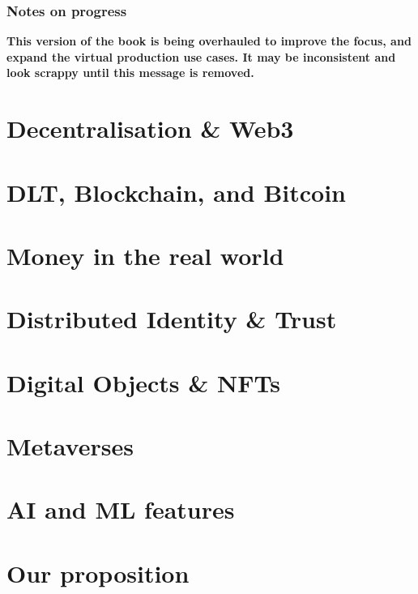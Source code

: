 \documentclass[
	12pt, %
	fleqn, %
	a4paper, %
	oneside, %
]{LegrandOrangeBook}
\begin{document}
\subsection{Notes on progress}
\textbf{This version of the book is being overhauled to improve the focus, and expand the virtual production use cases. It may be inconsistent and look scrappy until this message is removed.}\
\chapter{Decentralisation \& Web3}


\chapter{DLT, Blockchain, and Bitcoin}

\chapter{Money in the real world}


%

\chapter{Distributed Identity \& Trust}


\chapter{Digital Objects \& NFTs}


\chapter{Metaverses}


\chapter{AI and ML features}


\chapter{Our proposition}

\end{document}
